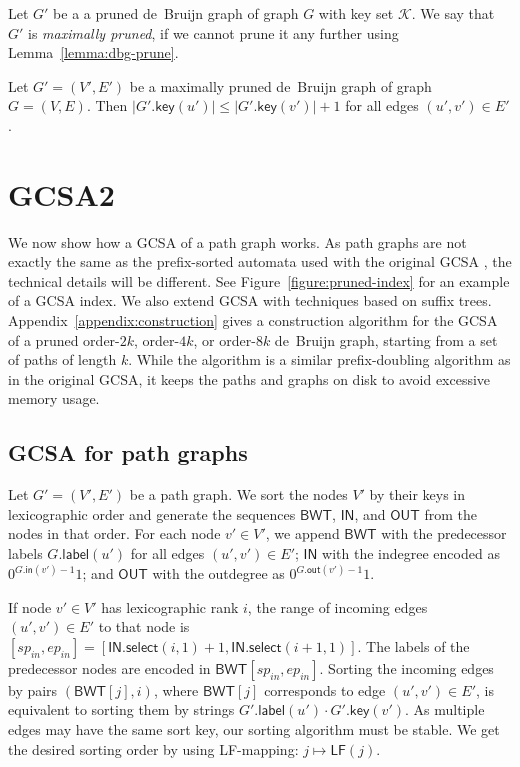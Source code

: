 \documentclass[a4paper,UKenglish]{lipics-v2016}
\newcommand{\abs}[1]{\ensuremath{\lvert #1 \rvert}}
\newcommand{\select}{\ensuremath{\mathsf{select}}}
\newcommand{\LF}{\ensuremath{\mathsf{LF}}}
\newcommand{\gindegree}{\ensuremath{\mathsf{in}}}
\newcommand{\goutdegree}{\ensuremath{\mathsf{out}}}
\newcommand{\glabel}{\ensuremath{\mathsf{label}}}
\newcommand{\gkey}{\ensuremath{\mathsf{key}}}
\newcommand{\orderk}[1]{order\nobreakdash-$#1$}
\newcommand{\LFmapping}{LF\nobreakdash-mapping}
\newcommand{\BWT}{\ensuremath{\mathsf{BWT}}}
\newcommand{\bvIN}{\ensuremath{\mathsf{IN}}}
\newcommand{\bvOUT}{\ensuremath{\mathsf{OUT}}}
\begin{document}
\begin{definition}
Let $G'$ be a a pruned de~Bruijn graph of graph $G$ with key set $\mathcal{K}$. We say that $G'$ is \emph{maximally pruned}, if we cannot prune it any further using Lemma~\ref{lemma:dbg-prune}.
\end{definition}

\begin{lemma}\label{lemma:dbg-maximal}
Let $G' = (V', E')$ be a maximally pruned de~Bruijn graph of graph $G = (V, E)$. Then $\abs{G'.\gkey(u')} \le \abs{G'.\gkey(v')}+1$ for all edges $(u', v') \in E'$.
\end{lemma}


\section{GCSA2}

We now show how a GCSA of a path graph works. As path graphs are not exactly the same as the prefix-sorted automata used with the original GCSA \cite{Siren2014}, the technical details will be different.
See Figure~\ref{figure:pruned-index} for an example of a GCSA index.
We also extend GCSA with techniques based on suffix trees.
Appendix~\ref{appendix:construction} gives a construction algorithm for the GCSA of a pruned \orderk{2k}, \orderk{4k}, or \orderk{8k} de~Bruijn graph, starting from a set of paths of length $k$. While the algorithm is a similar prefix-doubling algorithm as in the original GCSA, it keeps the paths and graphs on disk to avoid excessive memory usage.

\subsection{GCSA for path graphs}

Let $G' = (V', E')$ be a path graph. We sort the nodes $V'$ by their keys in lexicographic order and generate the sequences $\BWT$, $\bvIN$, and $\bvOUT$ from the nodes in that order. For each node $v' \in V'$, we append $\BWT$ with the predecessor labels $G.\glabel(u')$ for all edges $(u', v') \in E'$; $\bvIN$ with the indegree encoded as $0^{G.\gindegree(v')-1} 1$; and $\bvOUT$ with the outdegree as $0^{G.\goutdegree(v')-1} 1$.

If node $v' \in V'$ has lexicographic rank $i$, the range of incoming edges $(u', v') \in E'$ to that node is $[sp_{in}, ep_{in}] = [\bvIN.\select(i, 1) + 1, \bvIN.\select(i+1, 1)]$. The labels of the predecessor nodes are encoded in $\BWT[sp_{in}, ep_{in}]$. Sorting the incoming edges by pairs $(\BWT[j], i)$, where $\BWT[j]$ corresponds to edge $(u', v') \in E'$, is equivalent to sorting them by strings $G'.\glabel(u') \cdot G'.\gkey(v')$. As multiple edges may have the same sort key, our sorting algorithm must be stable. We get the desired sorting order by using \LFmapping: $j \mapsto \LF(j)$.
\end{document}
